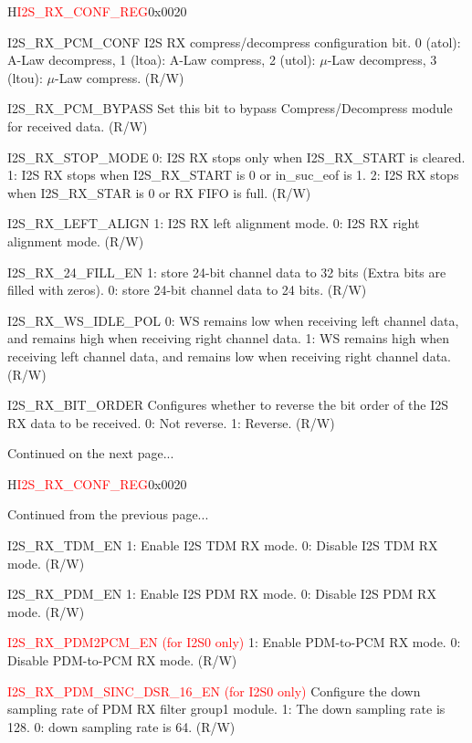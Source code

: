 \begin{register}{H}{\textcolor{red}{I2S\_RX\_CONF\_REG}}{0x{}0020}
\begin{regdesc}
\begin{reglist}
\label{fielddesc:I2SRXPCMCONF}\item [I2S\_RX\_PCM\_CONF] I2S RX compress/decompress configuration bit. 0 (atol): A-Law decompress, 1 (ltoa): A-Law compress, 2 (utol): $\mu$-Law decompress, 3 (ltou): $\mu$-Law compress. (R/W)
\label{fielddesc:I2SRXPCMBYPASS}\item [I2S\_RX\_PCM\_BYPASS] Set this bit to bypass Compress/Decompress module for received data. (R/W)
\label{fielddesc:I2SRXSTOPMODE}\item [I2S\_RX\_STOP\_MODE] 0: I2S RX stops only when I2S\_RX\_START is cleared. 1: I2S RX stops when I2S\_RX\_START is 0 or in\_suc\_eof is 1. 2: I2S RX stops when I2S\_RX\_STAR is 0 or RX FIFO is full. (R/W)
\label{fielddesc:I2SRXLEFTALIGN}\item [I2S\_RX\_LEFT\_ALIGN] 1: I2S RX left alignment mode. 0: I2S RX right alignment mode. (R/W)
\label{fielddesc:I2SRX24FILLEN}\item [I2S\_RX\_24\_FILL\_EN] 1: store 24-bit channel data to 32 bits (Extra bits are filled with zeros). 0: store 24-bit channel data to 24 bits. (R/W)
\label{fielddesc:I2SRXWSIDLEPOL}\item [I2S\_RX\_WS\_IDLE\_POL] 0: WS remains low when receiving left channel data, and remains high when receiving right channel data. 1: WS remains high when receiving left channel data, and remains low when receiving right channel data. (R/W)
\label{fielddesc:I2SRXBITORDER}\item [I2S\_RX\_BIT\_ORDER] Configures whether to reverse the bit order of the I2S RX data to be received. 0: Not reverse. 1: Reverse. (R/W)
\item [Continued on the next page...]
\end{reglist}\end{regdesc}
\end{register}

\addtocounter{Regfloat}{-1}
\begin{register}{H}{\textcolor{red}{I2S\_RX\_CONF\_REG}}{0x{}0020}
\begin{regdesc}\begin{reglist}
\item [Continued from the previous page...]
\label{fielddesc:I2SRXTDMEN}\item [I2S\_RX\_TDM\_EN] 1: Enable I2S TDM RX mode. 0: Disable I2S TDM RX mode. (R/W)
\label{fielddesc:I2SRXPDMEN}\item [I2S\_RX\_PDM\_EN] 1: Enable I2S PDM RX mode. 0: Disable I2S PDM RX mode. (R/W)
\label{fielddesc:I2SRXPDM2PCMEN}\item [\textcolor{red}{I2S\_RX\_PDM2PCM\_EN (for I2S0 only)}] 1: Enable PDM-to-PCM RX mode. 0: Disable PDM-to-PCM RX mode. (R/W)
\label{fielddesc:I2SRXPDMSINCDSR16EN}\item [\textcolor{red}{I2S\_RX\_PDM\_SINC\_DSR\_16\_EN (for I2S0 only)}] Configure the down sampling rate of PDM RX filter group1 module. 1: The down sampling rate is 128. 0: down sampling rate is 64. (R/W)
\end{reglist}\end{regdesc}
\end{register}



